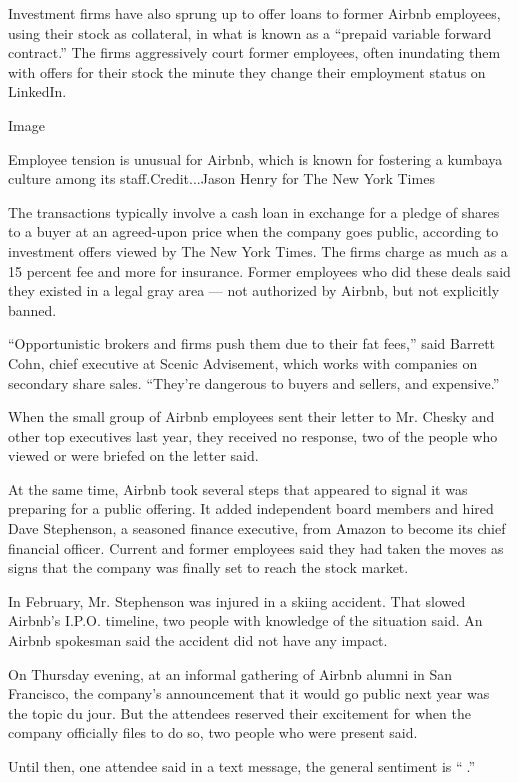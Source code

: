 Investment firms have also sprung up to offer loans to former Airbnb
employees, using their stock as collateral, in what is known as a
``prepaid variable forward contract.'' The firms aggressively court
former employees, often inundating them with offers for their stock the
minute they change their employment status on LinkedIn.

Image

Employee tension is unusual for Airbnb, which is known for fostering a
kumbaya culture among its staff.Credit...Jason Henry for The New York
Times

The transactions typically involve a cash loan in exchange for a pledge
of shares to a buyer at an agreed-upon price when the company goes
public, according to investment offers viewed by The New York Times. The
firms charge as much as a 15 percent fee and more for insurance. Former
employees who did these deals said they existed in a legal gray area ---
not authorized by Airbnb, but not explicitly banned.

``Opportunistic brokers and firms push them due to their fat fees,''
said Barrett Cohn, chief executive at Scenic Advisement, which works
with companies on secondary share sales. ``They're dangerous to buyers
and sellers, and expensive.''

When the small group of Airbnb employees sent their letter to Mr. Chesky
and other top executives last year, they received no response, two of
the people who viewed or were briefed on the letter said.

At the same time, Airbnb took several steps that appeared to signal it
was preparing for a public offering. It added independent board members
and hired Dave Stephenson, a seasoned finance executive, from Amazon to
become its chief financial officer. Current and former employees said
they had taken the moves as signs that the company was finally set to
reach the stock market.

In February, Mr. Stephenson was injured in a skiing accident. That
slowed Airbnb's I.P.O. timeline, two people with knowledge of the
situation said. An Airbnb spokesman said the accident did not have any
impact.

On Thursday evening, at an informal gathering of Airbnb alumni in San
Francisco, the company's announcement that it would go public next year
was the topic du jour. But the attendees reserved their excitement for
when the company officially files to do so, two people who were present
said.

Until then, one attendee said in a text message, the general sentiment
is ``🤷.''


